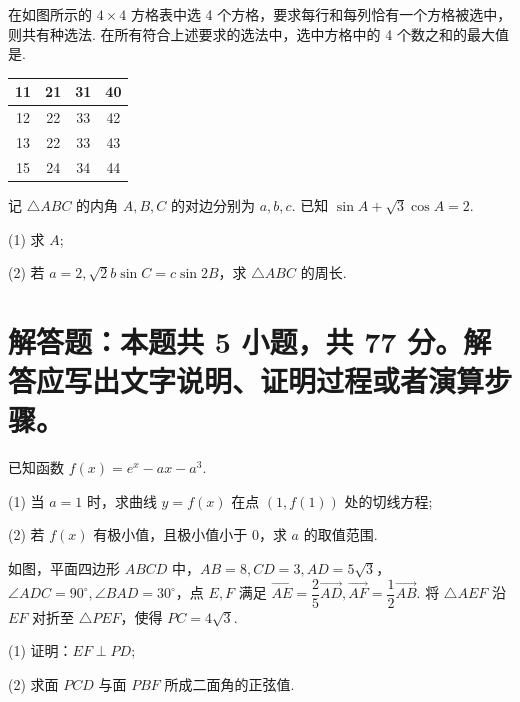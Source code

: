 \documentclass{exam-zh}
\begin{document}
\begin{question}
在如图所示的 $4\times 4$ 方格表中选 4 个方格，要求每行和每列恰有一个方格被选中，则共有\underline{\hspace{4em}}种选法. 在所有符合上述要求的选法中，选中方格中的 4 个数之和的最大值是\underline{\hspace{4em}}.
\begin{center}
\begin{tabular}{|c|c|c|c|}
\hline
11 & 21 & 31 & 40 \\
\hline
12 & 22 & 33 & 42 \\
\hline
13 & 22 & 33 & 43 \\
\hline
15 & 24 & 34 & 44 \\
\hline
\end{tabular}
\end{center}
\end{question}

\begin{question}
记 $\triangle ABC$ 的内角 $A,B,C$ 的对边分别为 $a,b,c$. 已知 $\sin A+\sqrt{3}\cos A=2$.

(1) 求 $A$;

(2) 若 $a=2, \sqrt{2}b\sin C=c\sin 2B$，求 $\triangle ABC$ 的周长.
\end{question}

\section{解答题：本题共 5 小题，共 77 分。解答应写出文字说明、证明过程或者演算步骤。}

\begin{problem}[points = 15]
已知函数 $f(x)=e^x-ax-a^3$.

(1) 当 $a=1$ 时，求曲线 $y=f(x)$ 在点 $(1,f(1))$ 处的切线方程;

(2) 若 $f(x)$ 有极小值，且极小值小于 0，求 $a$ 的取值范围.
\end{problem}

\begin{problem}[points = 15]
如图，平面四边形 $ABCD$ 中，$AB=8, CD=3, AD=5\sqrt{3}$，$\angle ADC=90^\circ, \angle BAD=30^\circ$，点 $E,F$ 满足 $\overrightarrow{AE}=\dfrac{2}{5}\overrightarrow{AD}, \overrightarrow{AF}=\dfrac{1}{2}\overrightarrow{AB}$. 将 $\triangle AEF$ 沿 $EF$ 对折至 $\triangle PEF$，使得 $PC=4\sqrt{3}$.

(1) 证明：$EF\perp PD$;

(2) 求面 $PCD$ 与面 $PBF$ 所成二面角的正弦值.
\end{problem}
\end{document}
